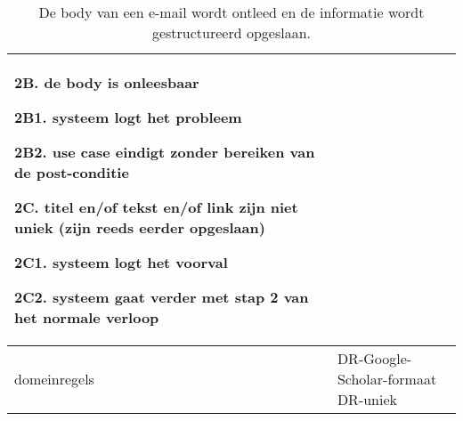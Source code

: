 \begin{table}[ptb]
\begin{tabular}{ | m{5cm} | m{10cm}| }
\begin{description}
            \item 2B. de body is onleesbaar
            \item 2B1. systeem logt het probleem
            \item 2B2. use case eindigt zonder bereiken van de post-conditie
            \item 2C. titel en/of tekst en/of link zijn niet uniek (zijn reeds eerder opgeslaan)
            \item 2C1. systeem logt het voorval
            \item 2C2. systeem gaat verder met stap 2 van het normale verloop
        \end{description} \\ 
        \hline
        domeinregels & \vbox{DR-Google-Scholar-formaat\\DR-uniek}\\ 
        \hline
    \end{tabular}
    \caption{De body van een e-mail wordt ontleed en de informatie wordt gestructureerd opgeslaan.}
\end{table}
\newpage
